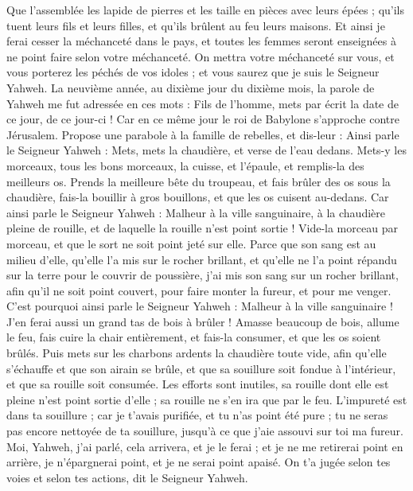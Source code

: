 \begin{multicols}{2}
Que l'assemblée les lapide de pierres et les taille en pièces avec leurs épées ; qu'ils tuent leurs fils et leurs filles, et qu'ils brûlent au feu leurs maisons.
Et ainsi je ferai cesser la méchanceté dans le pays, et toutes les femmes seront enseignées à ne point faire selon votre méchanceté.
On mettra votre méchanceté sur vous, et vous porterez les péchés de vos idoles ; et vous saurez que je suis le Seigneur Yahweh.
\VerseOne{}La neuvième année, au dixième jour du dixième mois, la parole de Yahweh me fut adressée en ces mots :
Fils de l'homme, mets par écrit la date de ce jour, de ce jour-ci ! Car en ce même jour le roi de Babylone s'approche contre Jérusalem.
Propose une parabole à la famille de rebelles, et dis-leur : Ainsi parle le Seigneur Yahweh : Mets, mets la chaudière, et verse de l'eau dedans.
Mets-y les morceaux, tous les bons morceaux, la cuisse, et l'épaule, et remplis-la des meilleurs os.
Prends la meilleure bête du troupeau, et fais brûler des os sous la chaudière, fais-la bouillir à gros bouillons, et que les os cuisent au-dedans.
Car ainsi parle le Seigneur Yahweh : Malheur à la ville sanguinaire, à la chaudière pleine de rouille, et de laquelle la rouille n'est point sortie ! Vide-la morceau par morceau, et que le sort ne soit point jeté sur elle.
Parce que son sang est au milieu d'elle, qu'elle l'a mis sur le rocher brillant, et qu'elle ne l'a point répandu sur la terre pour le couvrir de poussière,
j'ai mis son sang sur un rocher brillant, afin qu'il ne soit point couvert, pour faire monter la fureur, et pour me venger.
C'est pourquoi ainsi parle le Seigneur Yahweh : Malheur à la ville sanguinaire ! J'en ferai aussi un grand tas de bois à brûler !
Amasse beaucoup de bois, allume le feu, fais cuire la chair entièrement, et fais-la consumer, et que les os soient brûlés.
Puis mets sur les charbons ardents la chaudière toute vide, afin qu'elle s'échauffe et que son airain se brûle, et que sa souillure soit fondue à l'intérieur, et que sa rouille soit consumée.
Les efforts sont inutiles, sa rouille dont elle est pleine n'est point sortie d'elle ; sa rouille ne s'en ira que par le feu.
L'impureté est dans ta souillure ; car je t'avais purifiée, et tu n'as point été pure ; tu ne seras pas encore nettoyée de ta souillure, jusqu'à ce que j'aie assouvi sur toi ma fureur.
Moi, Yahweh, j'ai parlé, cela arrivera, et je le ferai ; et je ne me retirerai point en arrière, je n'épargnerai point, et je ne serai point apaisé. On t'a jugée selon tes voies et selon tes actions, dit le Seigneur Yahweh.

\end{multicols}
